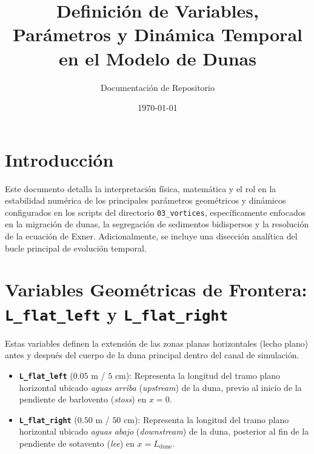 \documentclass[11pt,a4paper]{article}
\title{\textbf{Definición de Variables, Parámetros y Dinámica Temporal en el Modelo de Dunas}}
\author{Documentación de Repositorio}
\date{\today}
\begin{document}
\maketitle

\section{Introducción}
Este documento detalla la interpretación física, matemática y el rol en la estabilidad numérica de los principales parámetros geométricos y dinámicos configurados en los scripts del directorio \texttt{03\_vortices}, específicamente enfocados en la migración de dunas, la segregación de sedimentos bidispersos y la resolución de la ecuación de Exner. Adicionalmente, se incluye una disección analítica del bucle principal de evolución temporal.

\section{Variables Geométricas de Frontera: \texttt{L\_flat\_left} y \texttt{L\_flat\_right}}
Estas variables definen la extensión de las zonas planas horizontales (lecho plano) antes y después del cuerpo de la duna principal dentro del canal de simulación.

\begin{itemize}
    \item \textbf{\texttt{L\_flat\_left}} ($0.05$ m / $5$ cm): Representa la longitud del tramo plano horizontal ubicado \textit{aguas arriba} (\textit{upstream}) de la duna, previo al inicio de la pendiente de barlovento (\textit{stoss}) en $x = 0$.
    \item \textbf{\texttt{L\_flat\_right}} ($0.50$ m / $50$ cm): Representa la longitud del tramo plano horizontal ubicado \textit{aguas abajo} (\textit{downstream}) de la duna, posterior al fin de la pendiente de sotavento (\textit{lee}) en $x = L_{\text{dune}}$.
\end{itemize}
\end{document}
